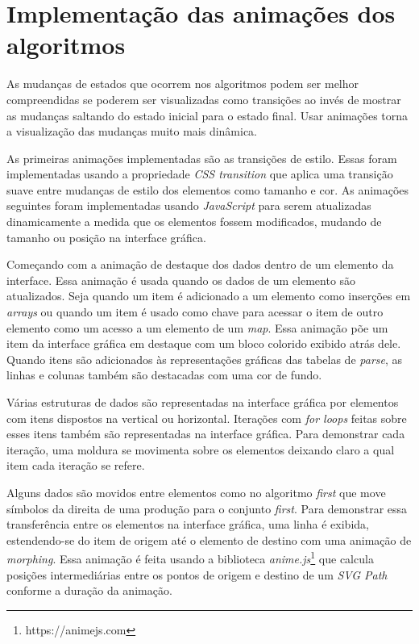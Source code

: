 \section{Implementação das animações dos algoritmos}
As mudanças de estados que ocorrem nos algoritmos podem ser melhor compreendidas se poderem ser visualizadas como transições ao invés de mostrar as mudanças saltando do estado inicial para o estado final. Usar animações torna a visualização das mudanças muito mais dinâmica.

As primeiras animações implementadas são as transições de estilo. Essas foram implementadas usando a propriedade \textit{CSS transition} que aplica uma transição suave entre mudanças de estilo dos elementos como tamanho e cor. As animações seguintes foram implementadas usando \textit{JavaScript} para serem atualizadas dinamicamente a medida que os elementos fossem modificados, mudando de tamanho ou posição na interface gráfica.

Começando com a animação de destaque dos dados dentro de um elemento da interface. Essa animação é usada quando os dados de um elemento são atualizados. Seja quando um item é adicionado a um elemento como inserções em \textit{arrays} ou quando um item é usado como chave para acessar o item de outro elemento como um acesso a um elemento de um \textit{map}. Essa animação põe um item da interface gráfica em destaque com um bloco colorido exibido atrás dele. Quando itens são adicionados às representações gráficas das tabelas de \textit{parse}, as linhas e colunas também são destacadas com uma cor de fundo.

Várias estruturas de dados são representadas na interface gráfica por elementos com itens dispostos na vertical ou horizontal. Iterações com \textit{for loops} feitas sobre esses itens também são representadas na interface gráfica. Para demonstrar cada iteração, uma moldura se movimenta sobre os elementos deixando claro a qual item cada iteração se refere.

Alguns dados são movidos entre elementos como no algoritmo \textit{first} que move símbolos da direita de uma produção para o conjunto \textit{first}. Para demonstrar essa transferência entre os elementos na interface gráfica, uma linha é exibida, estendendo-se do item de origem até o elemento de destino com uma animação de \textit{morphing}. Essa animação é feita usando a biblioteca \textit{anime.js}\footnote{https://animejs.com} que calcula posições intermediárias entre os pontos de origem e destino de um \textit{SVG Path} conforme a duração da animação.

